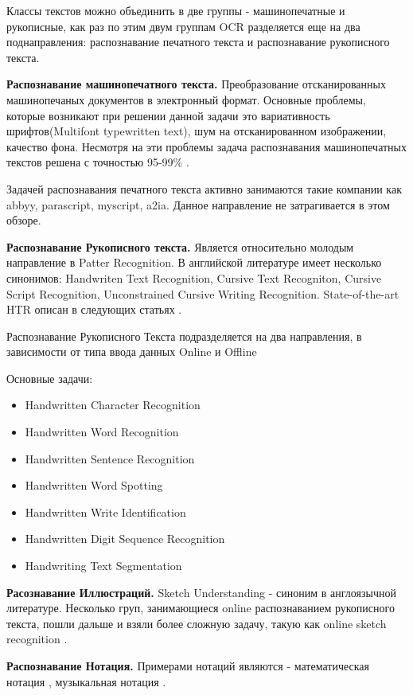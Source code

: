 Классы текстов можно объединить в две группы - машинопечатные и рукописные, как раз по этим двум группам OCR разделяется еще на два поднаправления: распознавание печатного текста и распознавание рукописного текста.

\textbf{Распознавание машинопечатного текста.} Преобразование отсканированных машинопечаных документов в электронный формат. Основные проблемы, которые возникают при решении данной задачи это вариативность шрифтов(Multifont typewritten text), шум на отсканированном изображении, качество фона. Несмотря на эти проблемы задача распознавания машинопечатных текстов решена с точностью 95-99\% \cite{breuel2013high}.

Задачей распознавания печатного текста активно занимаются такие компании как abbyy, parascript, myscript, a2ia. Данное направление не затрагивается в этом обзоре.

\textbf{Распознавание Рукописного текста.} Является относительно молодым направление в Patter Recognition. В английской литературе имеет несколько синонимов: Handwriten Text Recognition, Cursive Text Recogniton, Cursive Script Recognition, Unconstrained Cursive Writing Recognition. State-of-the-art HTR описан в следующих статьях \cite{rehman2012off} \cite{bunke2003recognition} \cite{fujisawa2008forty} \cite{steinherz1999offline}.

Распознавание Рукописного Текста подразделяется на два направления, в зависимости от типа ввода данных Online и Offline

\noindent Основные задачи:
\begin{itemize}
  \item Handwritten Character Recognition
  \item Handwritten Word Recognition
  \item Handwritten Sentence Recognition
  \item Handwritten Word Spotting
  \item Handwritten Write Identification
  \item Handwritten Digit Sequence Recognition
  \item Handwriting Text Segmentation
\end{itemize}

\textbf{Расознавание Иллюстраций.} Sketch Understanding - синоним в англоязычной литературе. Несколько груп, занимающиеся online распознаванием рукописного текста, пошли дальше и взяли более сложную задачу, такую как online sketch recognition \cite{davis2007magic}.

\textbf{Распознавание Нотация.} Примерами нотаций являются - математическая нотация \cite{miyao2004online}, музыкальная нотация \cite{mitobe2004fast, low2012optical}.


